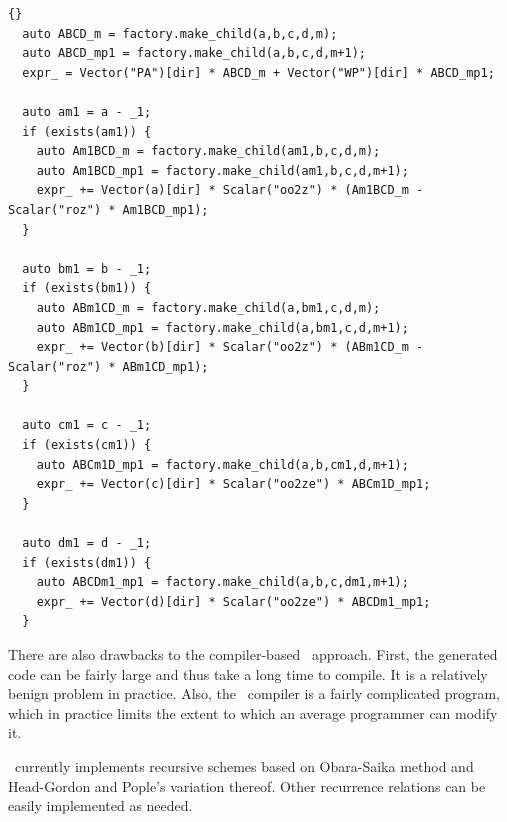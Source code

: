 \documentclass[10pt]{article}
\begin{document}
\begin{lstlisting}[label=lst:osrrcode,caption=Example specification of an
Obara-Saika recurrence relation in \LIBINT\ compiler (see {\tt
src/bin/libint2/vrr\_11\_twoprep\_11.h}).
The corresponding mathematical expression is shown in Eq. \eqref{eq:osvrrA}]{}
  auto ABCD_m = factory.make_child(a,b,c,d,m);
  auto ABCD_mp1 = factory.make_child(a,b,c,d,m+1);
  expr_ = Vector("PA")[dir] * ABCD_m + Vector("WP")[dir] * ABCD_mp1;
  
  auto am1 = a - _1;
  if (exists(am1)) {
    auto Am1BCD_m = factory.make_child(am1,b,c,d,m);
    auto Am1BCD_mp1 = factory.make_child(am1,b,c,d,m+1);
    expr_ += Vector(a)[dir] * Scalar("oo2z") * (Am1BCD_m - Scalar("roz") * Am1BCD_mp1);
  }

  auto bm1 = b - _1;
  if (exists(bm1)) {
    auto ABm1CD_m = factory.make_child(a,bm1,c,d,m);
    auto ABm1CD_mp1 = factory.make_child(a,bm1,c,d,m+1);
    expr_ += Vector(b)[dir] * Scalar("oo2z") * (ABm1CD_m - Scalar("roz") * ABm1CD_mp1);
  }

  auto cm1 = c - _1;
  if (exists(cm1)) {
    auto ABCm1D_mp1 = factory.make_child(a,b,cm1,d,m+1);
    expr_ += Vector(c)[dir] * Scalar("oo2ze") * ABCm1D_mp1;
  }

  auto dm1 = d - _1;
  if (exists(dm1)) {
    auto ABCDm1_mp1 = factory.make_child(a,b,c,dm1,m+1);
    expr_ += Vector(d)[dir] * Scalar("oo2ze") * ABCDm1_mp1;
  }
\end{lstlisting}

There are also drawbacks to the compiler-based \LIBINT\ approach. First, the
generated code can be fairly large and thus take a long time to compile.
It is a relatively benign problem in practice.
Also, the \LIBINT\ compiler is a fairly complicated program, which in practice
limits the extent to which an average programmer can modify it.

\LIBINT\ currently implements recursive schemes based on Obara-Saika method\cite{Obara86} and Head-Gordon and Pople's
variation thereof.\cite{Head-Gordon88} Other recurrence relations can be easily implemented as needed.
\end{document}
